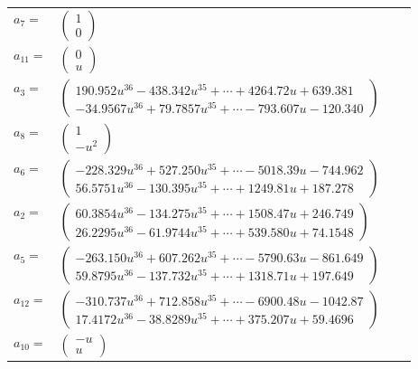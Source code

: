 \documentclass[1p]{elsarticle_modified}
\theoremstyle{definition}
\begin{document}
\begin{tabular}{m{7pt} m{180pt} m{7pt} m{180pt} }
\flushright $a_{7}=$&$\begin{pmatrix}1\\0\end{pmatrix}$ \\
\flushright $a_{11}=$&$\begin{pmatrix}0\\u\end{pmatrix}$ \\
\flushright $a_{3}=$&$\begin{pmatrix}190.952 u^{36}-438.342 u^{35}+\cdots+4264.72 u+639.381\\-34.9567 u^{36}+79.7857 u^{35}+\cdots-793.607 u-120.340\end{pmatrix}$ \\
\flushright $a_{8}=$&$\begin{pmatrix}1\\- u^2\end{pmatrix}$ \\
\flushright $a_{6}=$&$\begin{pmatrix}-228.329 u^{36}+527.250 u^{35}+\cdots-5018.39 u-744.962\\56.5751 u^{36}-130.395 u^{35}+\cdots+1249.81 u+187.278\end{pmatrix}$ \\
\flushright $a_{2}=$&$\begin{pmatrix}60.3854 u^{36}-134.275 u^{35}+\cdots+1508.47 u+246.749\\26.2295 u^{36}-61.9744 u^{35}+\cdots+539.580 u+74.1548\end{pmatrix}$ \\
\flushright $a_{5}=$&$\begin{pmatrix}-263.150 u^{36}+607.262 u^{35}+\cdots-5790.63 u-861.649\\59.8795 u^{36}-137.732 u^{35}+\cdots+1318.71 u+197.649\end{pmatrix}$ \\
\flushright $a_{12}=$&$\begin{pmatrix}-310.737 u^{36}+712.858 u^{35}+\cdots-6900.48 u-1042.87\\17.4172 u^{36}-38.8289 u^{35}+\cdots+375.207 u+59.4696\end{pmatrix}$ \\
\flushright $a_{10}=$&$\begin{pmatrix}- u\\u\end{pmatrix}$ \\

\end{tabular}
\end{document}

